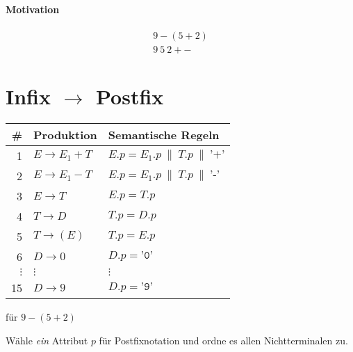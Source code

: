 \paragraph{Motivation}
\begin{align*}
 9 - (5 + 2) \tag{Infix}\\
 9\ 5\ 2 + - \tag{Postfix}
\end{align*}

\section{Infix $\to$ Postfix}
\begin{center}
 \begin{tabular}{r|l|l}
  \#&\textbf{Produktion}	& \textbf{Semantische Regeln} \\\hline\hline
  1& $E \to E_1 + T$		& $E.p = E_1.p\ \|\ T.p\ \|\ \texttt{'+'}$ \\\hline
  2&$E \to E_1 - T$ 		& $E.p = E_1.p\ \|\ T.p\ \|\ \texttt{'-'}$\\\hline
  3&$E \to T$ 				& $E.p = T.p$\\\hline
  4&$T \to D$ 				& $T.p = D.p$\\\hline
  5&$T \to (E)$ 			& $T.p = E.p$\\\hline
  6&$D \to 0$ 				& $D.p = \texttt{'0'}$\\\hline
  $\vdots$&$\vdots$			& $\vdots$\\\hline
  15&$D \to 9$ 				& $D.p = \texttt{'9'}$
 \end{tabular}
\end{center}\pagebreak
für $9 - (5 + 2)$
\begin{center}
\end{center}
Wähle \emph{ein} Attribut $p$ für Postfixnotation und ordne es allen Nichtterminalen zu.

